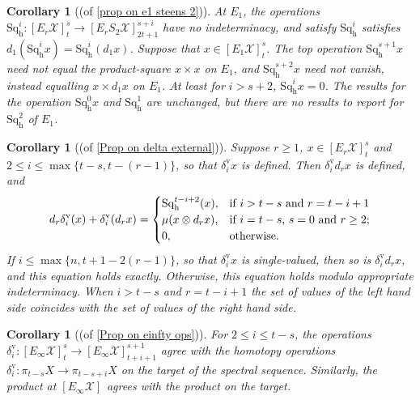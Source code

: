 \documentclass[11pt]{amsart} \renewcommand{\baselinestretch}{1.2}
\theoremstyle{plain}
\newtheorem{cor}[thm]{Corollary}
\theoremstyle{definition}
\renewcommand{\to}{\longrightarrow}
\newcommand{\calx}{\mathcal{X}}
\newcommand{\Sq}{\mathrm{Sq}}
\newcommand{\E}[5]{[E^{#1}_{#2}#3]^{#4}_{#5}}
\newcommand{\Edownup}[5]{[E_{#1}^{#2}#3]^{#4}_{#5}}
\newcommand{\uver}{^\mathrm{v}}
\newcommand{\dhor}{_\mathrm{h}}
\newcommand{\Sqh}{\mathrm{Sq}\dhor}
\newcommand{\deltav}{\delta\uver}
\begin{document}
\begin{Operations on the Bousfield-Kan spectral sequence}
\begin{cor}[(of \ref{prop on e1 steens 2})]
\label{prop on e1 steens 2 composed with lift}
At $E_1$, the operations $\Sq\dhor^i:\Edownup{r}{}{\calx}{s}{t}\to \Edownup{r}{}{S_2\calx}{s+i}{2t+1}$ have no indeterminacy, and satisfy $\Sqh^i$ satisfies $d_{1}(\Sqh^ix)=\Sqh^{i}(d_1x)$. Suppose that $x\in \Edownup{1}{}{\calx}{s}{t}$.
The top operation $\Sqh^{s+1}x$ \emph{need not} equal the product-square $x\times x$ on $E_1$, and
$\Sqh^{s+2}x$ \emph{need not} vanish, instead equalling $x\times d_1x$ on $E_1$.
At least for $i>s+2$, $\Sqh^ix=0$. The results for the operation $\Sqh^0x$ and $\Sqh^{1}$ are unchanged, but there are no results to report for $\Sqh^{2}$ of $E_1$.
\end{cor}

\begin{cor}[(of \ref{Prop on delta external})]
\label{Prop on delta external composed with lift}
Suppose $r\geq1$, $x\in \E{}{r}{\calx}{s}{t}$ and $2\leq i\leq \max\{t-s,t-(r-1)\}$, so that $\deltav_ix $ is defined. Then $\deltav_i d_r x$ is defined, and 
\[d_r\deltav_i(x)+ \deltav_i(d_rx)=\begin{cases}
\Sqh^{t-i+2}(x),&\textup{if $i>t-s$ and $r =t-i+1$}\\
\mu(x\otimes d_rx),&\textup{if $i=t-s$,  $s=0$ and $r\geq2$};\\
0,&\textup{otherwise.}
\end{cases}\]
If $i\leq \max\{n,t+1-2(r-1)\}$, so that $\deltav_i x$ is single-valued, then so is $\deltav_i d_r x$, and this equation holds exactly. Otherwise, this equation holds modulo appropriate indeterminacy. When $i>t-s$ and $r =t-i+1$ the set of values of the left hand side coincides with the set of values of the right hand side.
\end{cor}

\begin{cor}[(of \ref{Prop on einfty ops})]
\label{Prop on einfty ops composed with lift}
For $2\leq i\leq t-s$, the operations $\deltav_i:\E{}{\infty}{\calx}{s}{t}\to \E{}{\infty}{\calx}{s+1}{t+i+1}$ agree with the homotopy operations $\deltav_i:\pi_{t-s}X\to \pi_{t-s+i}X$ on the target of the spectral sequence. Similarly, the product at $\E{}{\infty}{\calx}{}{}$ agrees with the product on the target.
\end{cor}




\end{Operations on the Bousfield-Kan spectral sequence}
\end{document}
